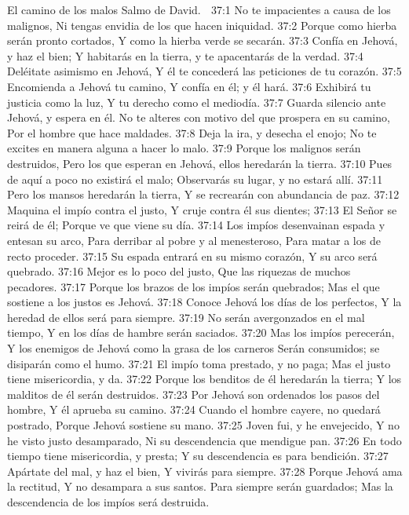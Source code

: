 El camino de los malos 
Salmo de David. 

37:1 No te impacientes a causa de los malignos, 
Ni tengas envidia de los que hacen iniquidad. 
37:2 Porque como hierba serán pronto cortados, 
Y como la hierba verde se secarán. 
37:3 Confía en Jehová, y haz el bien; 
Y habitarás en la tierra, y te apacentarás de la verdad. 
37:4 Deléitate asimismo en Jehová, 
Y él te concederá las peticiones de tu corazón. 
37:5 Encomienda a Jehová tu camino, 
Y confía en él; y él hará. 
37:6 Exhibirá tu justicia como la luz, 
Y tu derecho como el mediodía. 
37:7 Guarda silencio ante Jehová, y espera en él. 
No te alteres con motivo del que prospera en su camino, 
Por el hombre que hace maldades. 
37:8 Deja la ira, y desecha el enojo; 
No te excites en manera alguna a hacer lo malo. 
37:9 Porque los malignos serán destruidos, 
Pero los que esperan en Jehová, ellos heredarán la tierra. 
37:10 Pues de aquí a poco no existirá el malo; 
Observarás su lugar, y no estará allí. 
37:11 Pero los mansos heredarán la tierra, 
Y se recrearán con abundancia de paz. 
37:12 Maquina el impío contra el justo, 
Y cruje contra él sus dientes; 
37:13 El Señor se reirá de él; 
Porque ve que viene su día. 
37:14 Los impíos desenvainan espada y entesan su arco, 
Para derribar al pobre y al menesteroso, 
Para matar a los de recto proceder. 
37:15 Su espada entrará en su mismo corazón, 
Y su arco será quebrado. 
37:16 Mejor es lo poco del justo, 
Que las riquezas de muchos pecadores. 
37:17 Porque los brazos de los impíos serán quebrados; 
Mas el que sostiene a los justos es Jehová. 
37:18 Conoce Jehová los días de los perfectos, 
Y la heredad de ellos será para siempre. 
37:19 No serán avergonzados en el mal tiempo, 
Y en los días de hambre serán saciados. 
37:20 Mas los impíos perecerán, 
Y los enemigos de Jehová como la grasa de los carneros 
Serán consumidos; se disiparán como el humo. 
37:21 El impío toma prestado, y no paga; 
Mas el justo tiene misericordia, y da. 
37:22 Porque los benditos de él heredarán la tierra; 
Y los malditos de él serán destruidos. 
37:23 Por Jehová son ordenados los pasos del hombre, 
Y él aprueba su camino. 
37:24 Cuando el hombre cayere, no quedará postrado, 
Porque Jehová sostiene su mano. 
37:25 Joven fui, y he envejecido, 
Y no he visto justo desamparado, 
Ni su descendencia que mendigue pan. 
37:26 En todo tiempo tiene misericordia, y presta; 
Y su descendencia es para bendición. 
37:27 Apártate del mal, y haz el bien, 
Y vivirás para siempre. 
37:28 Porque Jehová ama la rectitud, 
Y no desampara a sus santos. 
Para siempre serán guardados; 
Mas la descendencia de los impíos será destruida. 
